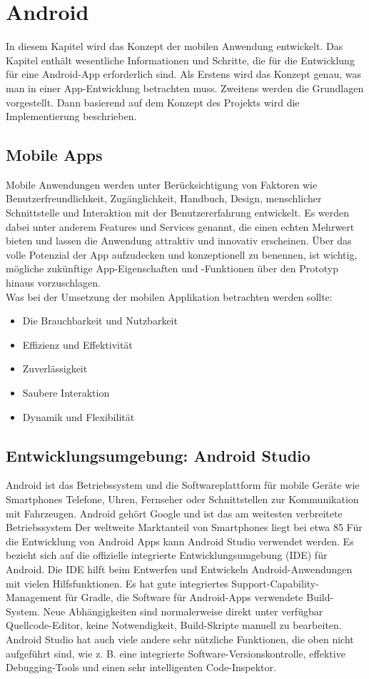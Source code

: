 \section{Android}

In diesem Kapitel wird das Konzept der mobilen Anwendung entwickelt. 
Das Kapitel enthält wesentliche Informationen und Schritte, die für die Entwicklung für eine Android-App erforderlich sind. 
Als Erstens wird das Konzept genau, was man in einer App-Entwicklung betrachten muss. Zweitens werden die Grundlagen vorgestellt.
Dann basierend auf dem Konzept des Projekts wird die Implementierung beschrieben.
\subsection{Mobile Apps}
Mobile Anwendungen werden unter Berücksichtigung von Faktoren wie Benutzerfreundlichkeit, Zugänglichkeit, Handbuch, Design, menschlicher Schnittstelle und Interaktion mit der Benutzererfahrung entwickelt. 
Es werden dabei unter anderem Features und Services genannt, die einen echten Mehrwert bieten und lassen die Anwendung attraktiv und innovativ erscheinen.
Über das volle Potenzial der App aufzudecken und konzeptionell zu benennen, ist wichtig, mögliche zukünftige App-Eigenschaften und -Funktionen über den Prototyp hinaus vorzuschlagen.\\
Was bei der Umsetzung der mobilen Applikation betrachten werden sollte:
\begin{itemize}
\item Die Brauchbarkeit und Nutzbarkeit 
\item Effizienz und Effektivität
\item Zuverlässigkeit
\item Saubere Interaktion
\item Dynamik und Flexibilität
\end{itemize}

\subsection{Entwicklungsumgebung: Android Studio}
Android ist das Betriebssystem und die Softwareplattform für mobile Geräte wie Smartphones
Telefone, Uhren, Fernseher oder Schnittstellen zur Kommunikation mit Fahrzeugen.
Android gehört Google und ist das am weitesten verbreitete Betriebssystem
Der weltweite Marktanteil von Smartphones liegt bei etwa 85 %
Für die Entwicklung von Android Apps kann Android Studio verwendet werden. 
Es bezieht sich auf die offizielle integrierte Entwicklungsumgebung (IDE) für Android. Die IDE hilft beim Entwerfen und Entwickeln Android-Anwendungen mit vielen Hilfsfunktionen. Es hat gute integriertes Support-Capability-Management für Gradle, die Software für Android-Apps verwendete Build-System. Neue Abhängigkeiten sind normalerweise direkt unter verfügbar Quellcode-Editor, keine Notwendigkeit, Build-Skripte manuell zu bearbeiten. 
Android Studio hat auch viele andere sehr nützliche Funktionen, die oben nicht aufgeführt sind, wie z. B. eine integrierte Software-Versionskontrolle, effektive Debugging-Tools und einen sehr intelligenten Code-Inspektor\cite{AndSt}.
